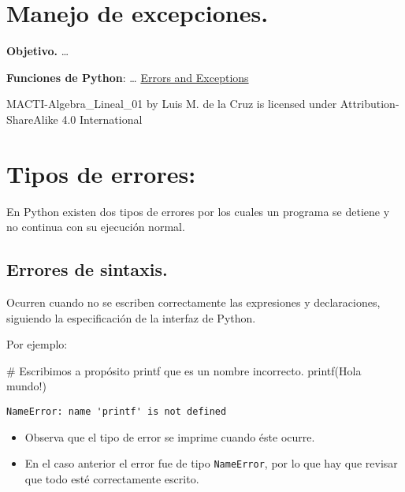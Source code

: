\documentclass[
  letterpaper,
  DIV=11,
  numbers=noendperiod]{scrreprt}
\newenvironment{Shaded}{\begin{snugshade}}{\end{snugshade}}
\newcommand{\CommentTok}[1]{\textcolor[rgb]{0.37,0.37,0.37}{#1}}
\newcommand{\NormalTok}[1]{\textcolor[rgb]{0.00,0.23,0.31}{#1}}
\newcommand{\StringTok}[1]{\textcolor[rgb]{0.13,0.47,0.30}{#1}}
\providecommand{\tightlist}{%
  \setlength{\itemsep}{0pt}\setlength{\parskip}{0pt}}\usepackage{longtable,booktabs,array}
\begin{document}

\chapter{Manejo de excepciones.}\label{manejo-de-excepciones.}

\textbf{Objetivo.} \ldots{}

\textbf{Funciones de Python}: \ldots{}
\href{https://docs.python.org/3/tutorial/errors.html}{Errors and
Exceptions}

MACTI-Algebra\_Lineal\_01 by Luis M. de la Cruz is licensed under
Attribution-ShareAlike 4.0 International


\chapter{Tipos de errores:}\label{tipos-de-errores}

En Python existen dos tipos de errores por los cuales un programa se
detiene y no continua con su ejecución normal.

\section{Errores de sintaxis.}\label{errores-de-sintaxis.}

Ocurren cuando no se escriben correctamente las expresiones y
declaraciones, siguiendo la especificación de la interfaz de Python.

Por ejemplo:

\begin{Shaded}
\begin{Highlighting}[]
\CommentTok{\# Escribimos a propósito \textquotesingle{}printf\textquotesingle{} que es un nombre incorrecto.}
\NormalTok{printf(}\StringTok{\textquotesingle{}Hola mundo!\textquotesingle{}}\NormalTok{)}
\end{Highlighting}
\end{Shaded}

\begin{verbatim}
NameError: name 'printf' is not defined
\end{verbatim}

\begin{itemize}
\tightlist
\item
  Observa que el tipo de error se imprime cuando éste ocurre.
\item
  En el caso anterior el error fue de tipo \texttt{NameError}, por lo
  que hay que revisar que todo esté correctamente escrito.
\end{itemize}
\end{document}
